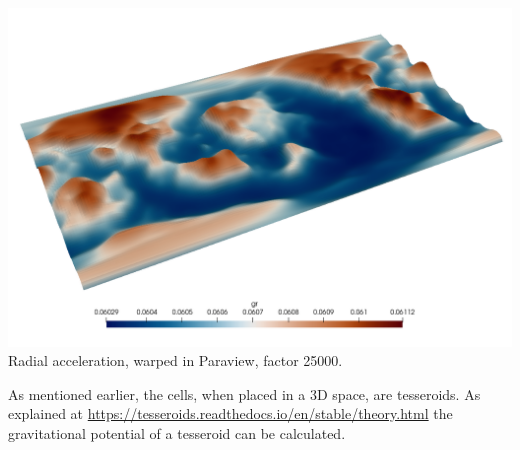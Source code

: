 \begin{center}
\includegraphics[width=14cm]{python_codes/fieldstone_98/images/gr_warp}\\
{\captionfont Radial acceleration, warped in Paraview, factor 25000.}
\end{center}

As mentioned earlier, the cells, when placed in a 3D space, are tesseroids. 
As explained at \url{https://tesseroids.readthedocs.io/en/stable/theory.html}
the gravitational potential of a tesseroid can be calculated. \mscthesis 




